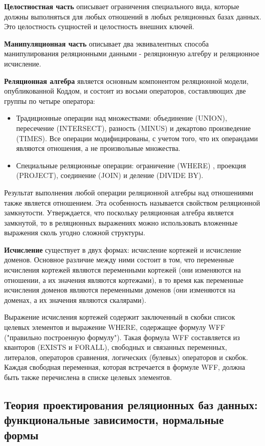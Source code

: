 \textbf{Целостностная часть} описывает ограничения специального вида, которые должны выполняться для любых отношений в любых реляционных базах данных. Это целостность сущностей и целостность внешних ключей.

\textbf{Манипуляционная часть} описывает два эквивалентных способа манипулирования реляционными данными - реляционную алгебру и реляционное исчисление.

\textbf{Реляционная алгебра} является основным компонентом реляционной модели, опубликованной Коддом, и состоит из восьми операторов, составляющих две группы по четыре оператора:
\begin{itemize}
	\item Традиционные операции над множествами: объединение (UNION), пересечение (INTERSECT), разность (MINUS) и декартово произведение (TIMES). Все операции модифицированы, с учетом того, что их операндами являются отношения, а не произвольные множества.
	\item Специальные реляционные операции: ограничение (WHERE) , проекция (PROJECT), соединение (JOIN) и деление (DIVIDE BY).
\end{itemize}

Результат выполнения любой операции реляционной алгебры над отношениями также является отношением. Эта особенность называется свойством реляционной замкнутости. Утверждается, что поскольку реляционная алгебра является замкнутой, то в реляционных выражениях можно использовать вложенные выражения сколь угодно сложной структуры.

\textbf{Исчисление} существует в двух формах: исчисление кортежей и исчисление доменов. Основное различие между ними состоит в том, что переменные исчисления кортежей являются переменными кортежей (они изменяются на отношении, а их значения являются кортежами), в то время как переменные исчисления доменов являются переменными доменов (они изменяются на доменах, а их значения являются скалярами).

Выражение исчисления кортежей содержит заключенный в скобки список целевых элементов и выражение WНERE, содержащее формулу WFF ("правильно построенную формулу"). Такая формула WFF составляется из кванторов (EXISTS и FORALL), свободных и связанных переменных, литералов, операторов сравнения, логических (булевых) операторов и скобок. Каждая свободная переменная, которая встречается в формуле WFF, должна быть также перечислена в списке целевых элементов.

\newpage

\subsection{Теория проектирования реляционных баз данных: функциональные зависимости, нормальные формы}

